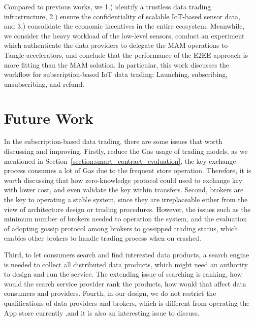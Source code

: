 \documentclass[conference]{IEEEtran}
\begin{document}
Compared to previous works, we 1.) identify a trustless data trading infrastructure, 2.) ensure the confidentiality of scalable IoT-based sensor data, and 3.) consolidate the economic incentives in the entire ecosystem. Meanwhile, we consider the heavy workload of the low-level sensors, conduct an experiment which authenticate the data providers to delegate the MAM operations to Tangle-accelerators, and conclude that the performance of the E2EE approach is more fitting than the MAM solution. In particular, this work discusses the workflow for subscription-based IoT data trading: Launching, subscribing, unsubscribing, and refund.

\section{Future Work}
\label{section:future_work}
In the subscription-based data trading, there are some issues that worth discussing and improving. Firstly, reduce the Gas usage of trading models, as we mentioned in Section~\ref{section:smart_contract_evaluation}, the key exchange process consumes a lot of Gas due to the frequent store operation. Therefore, it is worth discussing that how zero-knowledge protocol could used to exchange key with lower cost, and even validate the key within transfers. Second, brokers are the key to operating a stable system, since they are irreplaceable either from the view of architecture design or trading procedures. However, the issues such as the minimum number of brokers needed to operation the system, and the evaluation of adopting gossip protocol among brokers to gossipped trading status, which enables other brokers to handle trading process when on crashed.

Third, to let consumers search and find interested data products, a search engine is needed to collect all distributed data products, which might need an authority to design and run the service. The extending issue of searching is ranking, how would the search service provider rank the products, how would that affect data consumers and providers. Fourth, in our design, we do not restrict the qualifications of data providers and brokers, which is different from operating the App store currently ,and it is also an interesting issue to discuss.




\end{document}
